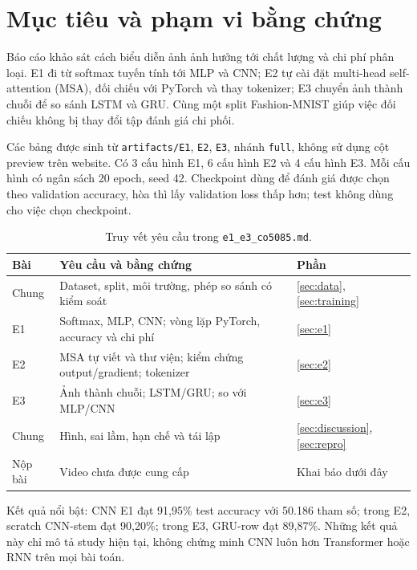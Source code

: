 \documentclass[11pt,a4paper]{article}
\begin{document}

\section{Mục tiêu và phạm vi bằng chứng}\label{sec:scope}
Báo cáo khảo sát cách biểu diễn ảnh ảnh hưởng tới chất lượng và chi phí phân loại. E1 đi từ softmax tuyến tính tới MLP và CNN; E2 tự cài đặt multi-head self-attention (MSA), đối chiếu với PyTorch và thay tokenizer; E3 chuyển ảnh thành chuỗi để so sánh LSTM và GRU. Cùng một split Fashion-MNIST giúp việc đối chiếu không bị thay đổi tập đánh giá chi phối.

Các bảng được sinh từ \texttt{artifacts/E1}, \texttt{E2}, \texttt{E3}, nhánh \texttt{full}, không sử dụng cột preview trên website. Có 3 cấu hình E1, 6 cấu hình E2 và 4 cấu hình E3. Mỗi cấu hình có ngân sách 20 epoch, seed 42. Checkpoint dùng để đánh giá được chọn theo validation accuracy, hòa thì lấy validation loss thấp hơn; test không dùng cho việc chọn checkpoint.

\begin{table}[htbp]\centering\small
\caption{Truy vết yêu cầu trong \texttt{e1\_e3\_co5085.md}.}
\begin{tabularx}{\linewidth}{lXl}\toprule Bài & Yêu cầu và bằng chứng & Phần\\\midrule
Chung & Dataset, split, môi trường, phép so sánh có kiểm soát & \ref{sec:data}, \ref{sec:training}\\
E1 & Softmax, MLP, CNN; vòng lặp PyTorch, accuracy và chi phí & \ref{sec:e1}\\
E2 & MSA tự viết và thư viện; kiểm chứng output/gradient; tokenizer & \ref{sec:e2}\\
E3 & Ảnh thành chuỗi; LSTM/GRU; so với MLP/CNN & \ref{sec:e3}\\
Chung & Hình, sai lầm, hạn chế và tái lập & \ref{sec:discussion}, \ref{sec:repro}\\
Nộp bài & Video chưa được cung cấp & Khai báo dưới đây\\\bottomrule
\end{tabularx}\end{table}

Kết quả nổi bật: CNN E1 đạt 91,95\% test accuracy với 50.186 tham số; trong E2, scratch CNN-stem đạt 90,20\%; trong E3, GRU-row đạt 89,87\%. Những kết quả này chỉ mô tả study hiện tại, không chứng minh CNN luôn hơn Transformer hoặc RNN trên mọi bài toán.
\disclosure
\clearpage
\end{document}
